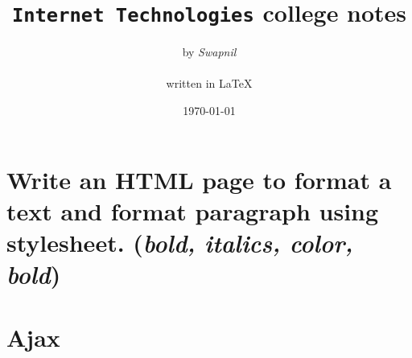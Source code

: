 \documentclass[11pt, a4paper, oneside]{article}
\title{\Huge{\texttt{Internet Technologies}} \large{college notes}}
\author{\huge{by \emph{Swapnil}}\\ \\ \Large{written in {\LaTeX}}}
\date{\today}
\begin{document}

  \maketitle
  \thispagestyle{empty}


\section{Write an HTML page to format a text and format paragraph using stylesheet. (\emph{bold, italics, color, bold})}
\section{Ajax}
\end{document}
